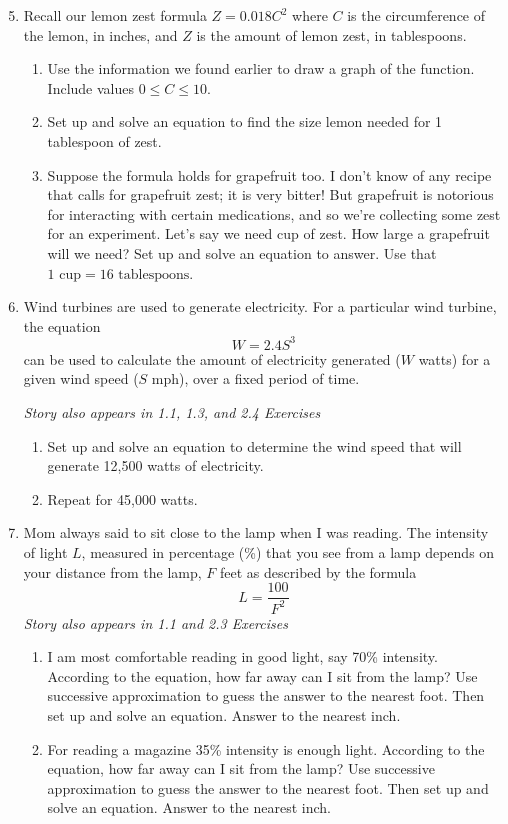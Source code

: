 \begin{enumerate} 
\setcounter{enumi}{4}

\item Recall our lemon zest formula $Z=0.018C^2$ where $C$ is the circumference of the lemon, in inches, and $Z$ is the amount of lemon zest, in tablespoons.
\begin{enumerate}
\item Use the information we found earlier to draw a graph of the function.  Include values $0 \le C \le 10$. 
\item Set up and solve an equation to find the size lemon needed for 1 tablespoon of zest.
\item Suppose the formula holds for grapefruit too.  I don't know of any recipe that calls for grapefruit zest; it is very bitter!  But grapefruit is notorious for interacting with certain medications, and so we're collecting some zest for an experiment.  Let's say we need  cup of zest.  How large a grapefruit will we need?  Set up and solve an equation to answer.  Use that $1 \text{ cup} = 16 \text{ tablespoons}$.
\end{enumerate}

\item Wind turbines are used to generate electricity.  For a particular wind turbine, the equation $$W = 2.4 S^3$$ can be used to calculate the amount of electricity generated ($W$ watts) for a given wind speed ($S$ mph), over a fixed period of time.

\hfill \emph{Story also appears in 1.1, 1.3, and 2.4 Exercises}
\begin{enumerate}
\item Set up and solve an equation to determine the wind speed that will generate 12,500 watts of electricity. 
\item Repeat for 45,000 watts.
\end{enumerate}

\item Mom always said to sit close to the lamp when I was reading.  The intensity of light $L$, measured in percentage (\%) that you see from a lamp depends on your distance from the lamp, $F$ feet as described by the formula $$L=\frac{100}{F^2}$$  
\hfill \emph{Story also appears in 1.1 and 2.3 Exercises}
\begin{enumerate}
\item I am most comfortable reading in good light, say 70\% intensity.  According to the equation, how far away can I sit from the lamp?  Use successive approximation to guess the answer to the nearest  foot.  Then set up and solve an equation.   Answer to the nearest inch.  
\item For reading a magazine 35\% intensity is enough light. According to the equation, how far away can I sit from the lamp?  Use successive approximation to guess the answer to the nearest  foot.  Then set up and solve an equation.   Answer to the nearest inch.  
\end{enumerate}


\end{enumerate}
